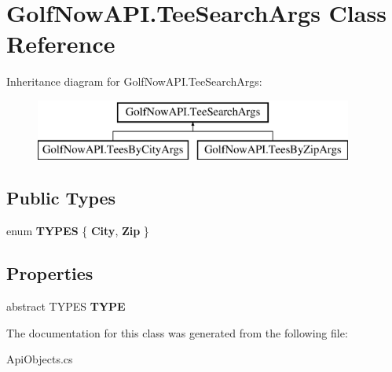 \hypertarget{class_golf_now_a_p_i_1_1_tee_search_args}{}\section{Golf\+Now\+A\+P\+I.\+Tee\+Search\+Args Class Reference}
\label{class_golf_now_a_p_i_1_1_tee_search_args}
Inheritance diagram for Golf\+Now\+A\+P\+I.\+Tee\+Search\+Args\+:\begin{figure}[H]
\begin{center}
\leavevmode
\includegraphics[height=2.000000cm]{class_golf_now_a_p_i_1_1_tee_search_args}
\end{center}
\end{figure}
\subsection*{Public Types}
\begin{DoxyCompactItemize}
\item 
\mbox{\label{class_golf_now_a_p_i_1_1_tee_search_args_ad76dd82d6771063a54c9d865de9bf704}} 
enum {\bfseries T\+Y\+P\+ES} \{ {\bfseries City}, 
{\bfseries Zip}
 \}
\end{DoxyCompactItemize}
\subsection*{Properties}
\begin{DoxyCompactItemize}
\item 
\mbox{\label{class_golf_now_a_p_i_1_1_tee_search_args_ac2308f76074de6f084694bd5b8262f07}} 
abstract T\+Y\+P\+ES {\bfseries T\+Y\+PE}
\end{DoxyCompactItemize}


The documentation for this class was generated from the following file\+:\begin{DoxyCompactItemize}
\item 
Api\+Objects.\+cs\end{DoxyCompactItemize}
